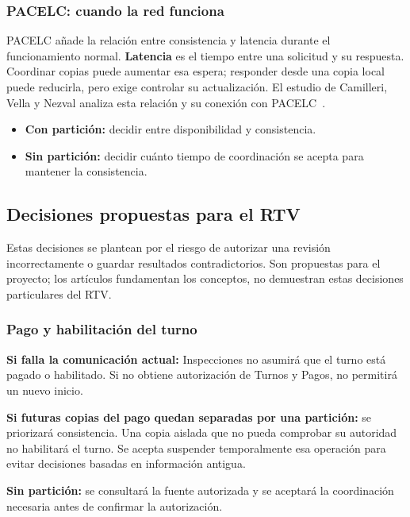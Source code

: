 \documentclass[11pt,a4paper]{article}
\begin{document}
\subsubsection{PACELC: cuando la red funciona}

PACELC añade la relación entre consistencia y latencia durante el funcionamiento normal. \textbf{Latencia} es el tiempo entre una solicitud y su respuesta. Coordinar copias puede aumentar esa espera; responder desde una copia local puede reducirla, pero exige controlar su actualización. El estudio de Camilleri, Vella y Nezval analiza esta relación y su conexión con PACELC~\cite{camilleri_horizontally_2024}.

\begin{itemize}[nosep]
  \item \textbf{Con partición:} decidir entre disponibilidad y consistencia.
  \item \textbf{Sin partición:} decidir cuánto tiempo de coordinación se acepta para mantener la consistencia.
\end{itemize}

\subsection{Decisiones propuestas para el RTV}

Estas decisiones se plantean por el riesgo de autorizar una revisión incorrectamente o guardar resultados contradictorios. Son propuestas para el proyecto; los artículos fundamentan los conceptos, no demuestran estas decisiones particulares del RTV.

\subsubsection{Pago y habilitación del turno}

\textbf{Si falla la comunicación actual:} Inspecciones no asumirá que el turno está pagado o habilitado. Si no obtiene autorización de Turnos y Pagos, no permitirá un nuevo inicio.

\textbf{Si futuras copias del pago quedan separadas por una partición:} se priorizará consistencia. Una copia aislada que no pueda comprobar su autoridad no habilitará el turno. Se acepta suspender temporalmente esa operación para evitar decisiones basadas en información antigua.

\textbf{Sin partición:} se consultará la fuente autorizada y se aceptará la coordinación necesaria antes de confirmar la autorización.
\end{document}
